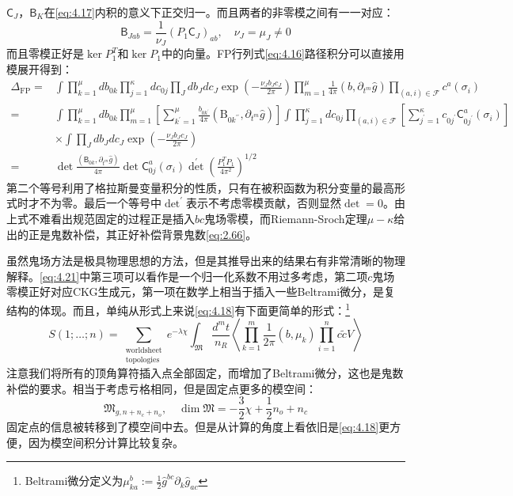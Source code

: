 $\mathsf{C}_J$，$\mathsf{B}_{K}$在\ref{eq:4.17}内积的意义下正交归一。而且两者的非零模之间有一一对应：
\begin{equation}
	\mathsf{B}_{Jab}=\frac{1}{\nu_J}(P_1\mathsf{C}_J)_{ab},\quad\nu_J=\mu_J\neq0
\end{equation}
而且零模正好是$\ker P_1^T$和$\ker{P_1}$中的向量。FP行列式\ref{eq:4.16}路径积分可以直接用模展开得到：
\begin{equation}
	\label{eq:4.21}
	\begin{aligned}
		\Delta_{\text{FP}}=&\int\prod_{k=1}^\mu db_{0k}\prod_{j=1}^\kappa dc_{0j}\prod_Jdb_Jdc_J\exp\left(-\frac{\nu_Jb_Jc_J}{2\pi}\right)\prod_{m=1}^\mu\frac{1}{4\pi}(b,\partial_{t^{m}}\hat{g})\prod_{(a,i)\in\mathcal{F}}c^a(\sigma_i)\\
		=&\int\prod_{k=1}^\mu db_{0k}\prod_{m=1}^\mu\left[\sum_{k^{\prime}=1}^\mu\frac{b_{0k^{\prime}}}{4\pi}\left(\mathrm{B}_{0k^{\prime\prime}},\partial_{t^m}\hat{g}\right)\right]
		\int\prod_{j=1}^\kappa dc_{0j}\prod_{(a,i)\in\mathcal{F}}\left[\sum_{j^{\prime}=1}^\kappa c_{0j^{\prime}}\mathsf{C}_{0j^{\prime}}^a(\sigma_i)\right]
		\\
		&\times\int\prod_Jdb_Jdc_J\exp\left(-\frac{\nu_Jb_Jc_J}{2\pi}\right)\\
		=&\det\frac{(\mathsf{B}_{0k},\partial_{t^m}\hat{g})}{4\pi}{\det}\mathsf{C}_{0j}^a(\sigma_i){\det}^{\prime}\left(\frac{P_1^TP_1}{4\pi^2}\right)^{1/2}
	\end{aligned}
\end{equation}
第二个等号利用了格拉斯曼变量积分的性质，只有在被积函数为积分变量的最高形式时才不为零。最后一个等号中${\det}^\prime$表示不考虑零模贡献，否则显然$\det=0$。由上式不难看出规范固定的过程正是插入$bc$鬼场零模，而Riemann-Sroch定理$\mu-\kappa$给出的正是鬼数补偿，其正好补偿背景鬼数\ref{eq:2.66}。

虽然鬼场方法是极具物理思想的方法，但是其推导出来的结果右有非常清晰的物理解释。\ref{eq:4.21}中第三项可以看作是一个归一化系数不用过多考虑，第二项$c$鬼场零模正好对应CKG生成元，第一项在数学上相当于插入一些Beltrami微分，是复结构的体现。而且，单纯从形式上来说\ref{eq:4.18}有下面更简单的形式：\footnote{Beltrami微分定义为$\mu_{ka}^b:=\frac{1}{2}\hat{g}^{bc}\partial_k\hat{g}_{ac}$}
\begin{equation}
	\label{eq:4.22}
	S(1;\ldots;n)=\sum_{\substack{\text{worldsheet}\\\text{topologies}}}e^{-\lambda\chi}\int_{\mathfrak{M}}\frac{d^mt}{n_R}\left\langle\prod_{k=1}^m\frac{1}{2\pi}(b,\mu_k)\prod_{i=1}^nc\tilde{c}V\right\rangle
\end{equation}
注意我们将所有的顶角算符插入点全部固定，而增加了Beltrami微分，这也是鬼数补偿的要求。相当于考虑亏格相同，但是固定点更多的模空间：
\begin{equation}
	\mathfrak{M}_{g,n+n_c+n_o},\quad \dim\mathfrak{M} = -\frac32 \chi + \frac12 n_o+n_c
\end{equation}
固定点的信息被转移到了模空间中去。但是从计算的角度上看依旧是\ref{eq:4.18}更方便，因为模空间积分计算比较复杂。

